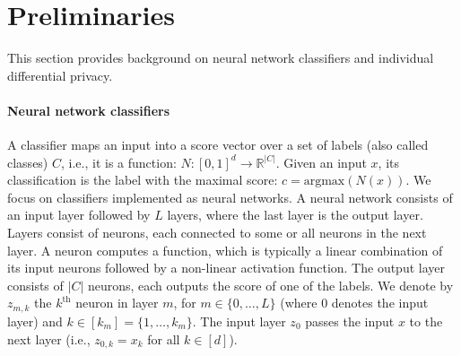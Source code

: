 \section{Preliminaries}
\label{sec:preliminary}
This section provides background on neural network classifiers and individual differential privacy.
  
\paragraph{Neural network classifiers}
A classifier maps an input into a score vector over a set of labels (also called classes) $C$, i.e., %
it is a function: $N:[0,1]^d\to \mathbb{R}^{|C|}$. 
Given an input $x$, its classification is the label with the maximal score: $c= \text{argmax}(N(x))$. 
We focus on classifiers implemented as neural networks.
A neural network consists of an input layer followed by $L$ layers, where the last layer is the output layer. 
Layers consist of neurons, each connected to some or all neurons in the next layer. 
A neuron computes a function, which is typically a linear combination of its input neurons followed by a non-linear activation function. 
The output layer consists of $|C|$ neurons, each outputs the score of one of the labels.
%
We denote by $z_{m,k}$ the $k^\text{th}$ neuron in layer $m$, for $m\in \{0,\ldots,L\}$ (where $0$ denotes the input layer) and $k\in [k_m]=\{1,\ldots,k_m\}$. 
The input layer $z_0$ passes the input $x$ to the next layer (i.e., $z_{0,k}=x_k$ for all $k\in [d]$).
